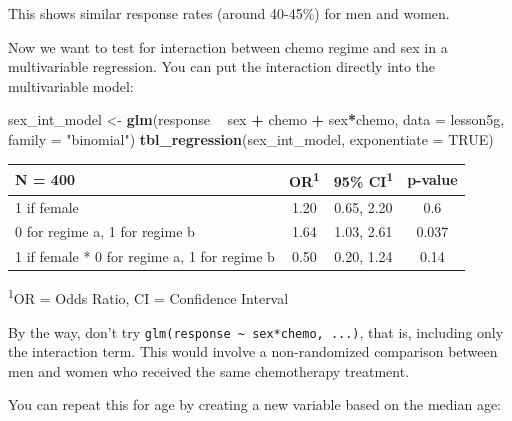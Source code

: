 \documentclass[]{book}
\newenvironment{Shaded}{\begin{snugshade}}{\end{snugshade}}
\newcommand{\CommentTok}[1]{\textcolor[rgb]{0.56,0.35,0.01}{\textit{#1}}}
\newcommand{\DataTypeTok}[1]{\textcolor[rgb]{0.13,0.29,0.53}{#1}}
\newcommand{\KeywordTok}[1]{\textcolor[rgb]{0.13,0.29,0.53}{\textbf{#1}}}
\newcommand{\NormalTok}[1]{#1}
\newcommand{\OperatorTok}[1]{\textcolor[rgb]{0.81,0.36,0.00}{\textbf{#1}}}
\newcommand{\OtherTok}[1]{\textcolor[rgb]{0.56,0.35,0.01}{#1}}
\newcommand{\StringTok}[1]{\textcolor[rgb]{0.31,0.60,0.02}{#1}}
\begin{document}
This shows similar response rates (around 40-45\%) for men and women.

Now we want to test for interaction between chemo regime and sex in a
multivariable regression. You can put the interaction directly into the
multivariable model:

\begin{Shaded}
\begin{Highlighting}[]
\NormalTok{sex_int_model <-}\StringTok{ }\KeywordTok{glm}\NormalTok{(response }\OperatorTok{~}\StringTok{ }\NormalTok{sex }\OperatorTok{+}\StringTok{ }\NormalTok{chemo }\OperatorTok{+}\StringTok{ }\NormalTok{sex}\OperatorTok{*}\NormalTok{chemo,}
                     \DataTypeTok{data =}\NormalTok{ lesson5g,}
                     \DataTypeTok{family =} \StringTok{"binomial"}\NormalTok{)}
\KeywordTok{tbl_regression}\NormalTok{(sex_int_model, }\DataTypeTok{exponentiate =} \OtherTok{TRUE}\NormalTok{)}
\end{Highlighting}
\end{Shaded}

\captionsetup[table]{labelformat=empty,skip=1pt}
\begin{longtable}{lccc}
\toprule
\textbf{N = 400} & \textbf{OR}\textsuperscript{1} & \textbf{95\% CI}\textsuperscript{1} & \textbf{p-value} \\ 
\midrule
1 if female & 1.20 & 0.65, 2.20 & 0.6 \\ 
0 for regime a, 1 for regime b & 1.64 & 1.03, 2.61 & 0.037 \\ 
1 if female * 0 for regime a, 1 for regime b & 0.50 & 0.20, 1.24 & 0.14 \\ 
\bottomrule
\end{longtable}
\vspace{-5mm}
\begin{minipage}{\linewidth}
\textsuperscript{1}OR = Odds Ratio, CI = Confidence Interval \\ 
\end{minipage}

By the way, don't try
\texttt{glm(response\ \textasciitilde{}\ sex*chemo,\ ...)}, that is,
including only the interaction term. This would involve a non-randomized
comparison between men and women who received the same chemotherapy
treatment.

You can repeat this for age by creating a new variable based on the
median age:

\begin{Shaded}
\end{Shaded}
\end{document}
